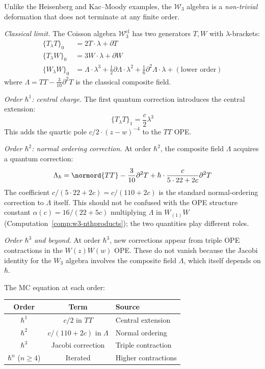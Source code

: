 \begin{computation}
\label{comp:w-algebra-deformation}

Unlike the Heisenberg and Kac--Moody examples, the $\mathcal{W}_3$
algebra is a \emph{non-trivial} deformation that does not terminate
at any finite order.

\emph{Classical limit.}
The Coisson algebra $\mathcal{W}_3^{\mathrm{cl}}$ has two
generators $T, W$ with $\lambda$-brackets:
\begin{align}
\{T_\lambda T\}_0 &= 2T \cdot \lambda + \partial T
\label{eq:w3-poisson-TT} \\
\{T_\lambda W\}_0 &= 3W \cdot \lambda + \partial W
\label{eq:w3-poisson-TW} \\
\{W_\lambda W\}_0 &= \Lambda \cdot \lambda^3
+ \frac{1}{2}\partial\Lambda \cdot \lambda^2
+ \frac{1}{6}\partial^2\Lambda \cdot \lambda
+ (\text{lower order})
\label{eq:w3-poisson-WW}
\end{align}
where $\Lambda = TT - \frac{3}{10}\partial^2 T$ is the
classical composite field.

\emph{Order $\hbar^1$: central charge.}
The first quantum correction introduces the central extension:
\[
\{T_\lambda T\}_1 = \frac{c}{2}\lambda^3
\]
This adds the quartic pole $c/2 \cdot (z-w)^{-4}$ to the $TT$ OPE.

\emph{Order $\hbar^2$: normal ordering correction.}
At order $\hbar^2$, the composite field $\Lambda$ acquires a
quantum correction:
\[
\Lambda_\hbar = \normord{TT}
- \frac{3}{10}\partial^2 T
+ \hbar \cdot \frac{c}{5 \cdot 22 + 2c}\partial^2 T
\]
The coefficient $c/(5 \cdot 22 + 2c) = c/(110 + 2c)$ is the
standard normal-ordering correction to $\Lambda$ itself.
This should not be confused with the OPE structure constant
$\alpha(c) = 16/(22+5c)$ multiplying $\Lambda$ in $W_{(1)}W$
(Computation~\ref{comp:w3-nthproducts}); the two quantities play
different roles.

\emph{Order $\hbar^3$ and beyond.}
At order $\hbar^3$, new corrections appear from triple OPE
contractions in the $W(z)W(w)$ OPE.  These do not vanish
because the Jacobi identity for the $W_3$ algebra involves
the composite field $\Lambda$, which itself depends on $\hbar$.

The MC equation at each order:
\begin{center}
\renewcommand{\arraystretch}{1.2}
\begin{tabular}{c|cl}
Order & Term & Source \\
\hline
$\hbar^1$ & $c/2$ in $TT$ & Central extension \\
$\hbar^2$ & $c/(110+2c)$ in $\Lambda$ & Normal ordering \\
$\hbar^3$ & Jacobi correction & Triple contraction \\
$\hbar^n$ ($n \geq 4$) & Iterated & Higher contractions
\end{tabular}
\end{center}


\end{computation}
